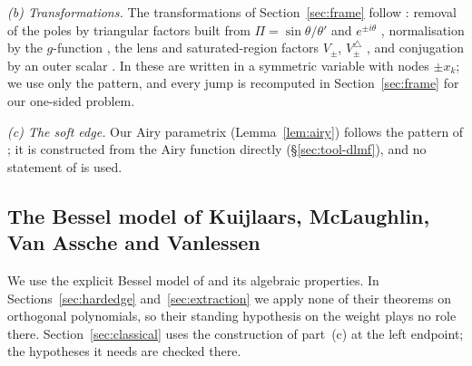 \emph{(b) Transformations.} The transformations of Section~\ref{sec:frame} follow \cite[\S\S3--5]{WLXZ}: removal of the
poles by triangular factors built from $\Pi=\sin\theta/\theta'$ and $e^{\pm i\theta}$ \cite[(3.9)--(3.15)]{WLXZ},
normalisation by the $g$-function \cite[(4.1)]{WLXZ}, the lens and saturated-region factors $V_\pm$, $V^\triangle_\pm$
\cite[(4.12)--(4.13)]{WLXZ}, and conjugation by an outer scalar \cite[(5.1)]{WLXZ}. In \cite{WLXZ} these are written in
a symmetric variable with nodes $\pm x_k$; we use only the pattern, and every jump is recomputed in
Section~\ref{sec:frame} for our one-sided problem.

\emph{(c) The soft edge.} Our Airy parametrix (Lemma~\ref{lem:airy}) follows the pattern of \cite[\S6.1, (6.4),
(6.10)--(6.12)]{WLXZ}; it is constructed from the Airy function directly (\S\ref{sec:tool-dlmf}), and no statement of
\cite{WLXZ} is used.

\subsection{The Bessel model of Kuijlaars, McLaughlin, Van Assche and Vanlessen}\label{sec:tool-bessel}

We use the explicit Bessel model of \cite[\S6]{KMVV} and its algebraic properties. In Sections~\ref{sec:hardedge}
and~\ref{sec:extraction} we apply none of their theorems on orthogonal polynomials, so their standing hypothesis on the
weight \cite[(1.1)]{KMVV} plays no role there. Section~\ref{sec:classical} uses the construction of part~(c) at the
left endpoint; the hypotheses it needs are checked there.

